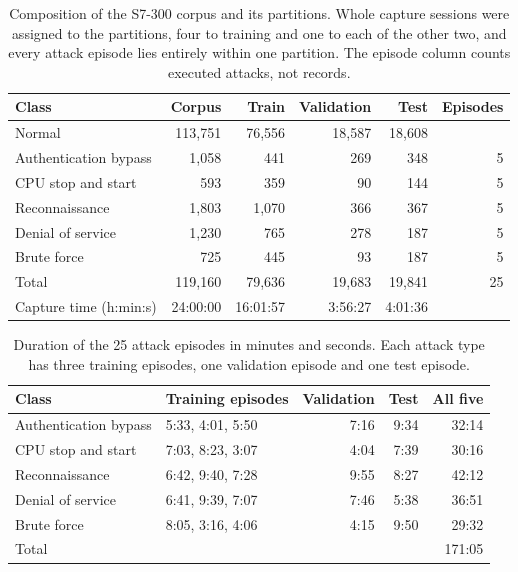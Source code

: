 \begin{table}[tbp]
  \centering
  \caption{Composition of the S7-300 corpus and its partitions. Whole capture sessions were
  assigned to the partitions, four to training and one to each of the other two, and every
  attack episode lies entirely within one partition. The episode column counts executed attacks,
  not records.}
  \label{tab:anomaly:iuno-corpus}
  \small
  \begin{tabular}{@{}lrrrrr@{}}
    \toprule
    Class & Corpus & Train & Validation & Test & Episodes \\
    \midrule
    Normal                 & 113,751 & 76,556 & 18,587 & 18,608 &    \\
    Authentication bypass  &   1,058 &    441 &    269 &    348 &  5 \\
    CPU stop and start     &     593 &    359 &     90 &    144 &  5 \\
    Reconnaissance         &   1,803 &  1,070 &    366 &    367 &  5 \\
    Denial of service      &   1,230 &    765 &    278 &    187 &  5 \\
    Brute force            &     725 &    445 &     93 &    187 &  5 \\
    \midrule
    Total                  & 119,160 & 79,636 & 19,683 & 19,841 & 25 \\
    Capture time (h:min:s) & 24:00:00 & 16:01:57 & 3:56:27 & 4:01:36 & \\
    \bottomrule
  \end{tabular}
\end{table}

\begin{table}[tbp]
  \centering
  \caption{Duration of the 25 attack episodes in minutes and seconds. Each attack type has three
  training episodes, one validation episode and one test episode.}
  \label{tab:anomaly:iuno-episodes}
  \small
  \begin{tabular}{@{}llrrr@{}}
    \toprule
    Class & Training episodes & Validation & Test & All five \\
    \midrule
    Authentication bypass & 5:33, 4:01, 5:50 & 7:16 & 9:34 & 32:14 \\
    CPU stop and start    & 7:03, 8:23, 3:07 & 4:04 & 7:39 & 30:16 \\
    Reconnaissance        & 6:42, 9:40, 7:28 & 9:55 & 8:27 & 42:12 \\
    Denial of service     & 6:41, 9:39, 7:07 & 7:46 & 5:38 & 36:51 \\
    Brute force           & 8:05, 3:16, 4:06 & 4:15 & 9:50 & 29:32 \\
    \midrule
    Total                 &                  &      &      & 171:05 \\
    \bottomrule
  \end{tabular}
\end{table}

